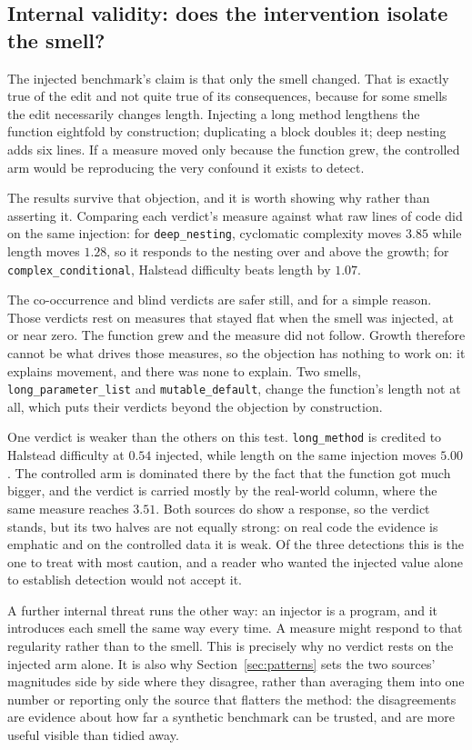 \documentclass[10pt,a4paper,twocolumn]{article}
\begin{document}
\subsection{Internal validity: does the intervention isolate the smell?}

The injected benchmark's claim is that only the smell changed. That is exactly
true of the edit and not quite true of its consequences, because for some smells
the edit necessarily changes length. Injecting a long method lengthens the
function eightfold by construction; duplicating a block doubles it; deep nesting
adds six lines. If a measure moved only because the function grew, the controlled
arm would be reproducing the very confound it exists to detect.

The results survive that objection, and it is worth showing why rather than
asserting it. Comparing each verdict's measure against what raw lines of code did
on the same injection: for \texttt{deep\_nesting}, cyclomatic complexity moves $3.85$ while length
moves $1.28$, so it responds to the nesting over and above the growth; for
\texttt{complex\_conditional}, Halstead difficulty beats length by $1.07$.

The co-occurrence and blind verdicts are safer still, and for a simple reason.
Those verdicts rest on measures that stayed flat when the smell was injected, at
or near zero. The function grew and the measure did not follow. Growth therefore
cannot be what drives those measures, so the objection has nothing to work on:
it explains movement, and there was none to explain. Two smells,
\texttt{long\_parameter\_list} and \texttt{mutable\_default}, change the
function's length not at all, which puts their verdicts beyond the objection by
construction.

One verdict is weaker than the others on this test. \texttt{long\_method} is
credited to Halstead difficulty at $0.54$ injected, while length on the same
injection moves $5.00$. The controlled arm is dominated there by the fact that the
function got much bigger, and the verdict is carried mostly by the real-world
column, where the same measure reaches $3.51$. Both sources do show a response, so
the verdict stands, but its two halves are not equally strong: on real code the
evidence is emphatic and on the controlled data it is weak. Of the three
detections this is the one to treat with most caution, and a reader who wanted the
injected value alone to establish detection would not accept it.

A further internal threat runs the other way: an injector is a program, and it
introduces each smell the same way every time. A measure might respond to that
regularity rather than to the smell. This is precisely why no verdict rests on
the injected arm alone. It is also why Section~\ref{sec:patterns} sets the two
sources' magnitudes side by side where they disagree, rather than averaging them
into one number or reporting only the source that flatters the method: the
disagreements are evidence about how far a synthetic benchmark can be trusted,
and are more useful visible than tidied away.
\end{document}
